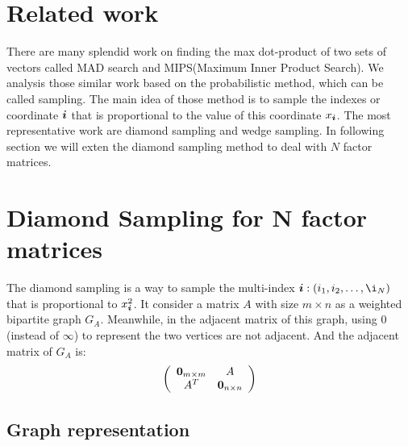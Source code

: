 \documentclass{article}
\newcommand{\V}[1]{{\bm{{\MakeLowercase{#1}}}}}%
\begin{document}
\section{Related work}

There are many splendid work on finding the max dot-product of two sets of vectors called MAD search and MIPS(Maximum Inner Product Search). We analysis those similar work based on the probabilistic method, which can be called sampling. The main idea of those method is to sample the indexes or coordinate $\V{i}$ that is proportional to the value of this coordinate $x_{\V{i}}$. The most representative work are diamond sampling and wedge sampling. In following section we will exten the diamond sampling method to deal with $N$ factor matrices.

\section{Diamond Sampling for N factor matrices}
The diamond sampling is a way to sample the multi-index $\V{i}:(i_1,i_2,\ldots,\i_N)$  that is proportional to $x_{\V{i}}^2$.
It consider a matrix $A$ with size $m\times n$ as a weighted bipartite graph $G_{A}$. Meanwhile, in the adjacent matrix of this graph, using $0$(instead of $\infty$) to represent the two vertices are not adjacent. And the adjacent matrix of $G_{A}$ is:
\[
\left(
  \begin{array}{cc}
    \V{0}_{m\times m} & A \\
    A^T & \V{0}_{n\times n} \\
  \end{array}
\right)
\]

\subsection{Graph representation}
\end{document}
